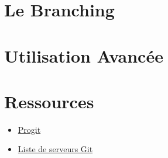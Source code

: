 \documentclass{beamer}
\begin{document}
\section{Le Branching}
\begin{frame}{}
\end{frame}

\section{Utilisation Avancée}
\begin{frame}{}
\end{frame}

\section{Ressources}
\begin{frame}{}
  \begin{itemize}
    \item \href{http://progit.org/about.html}{Progit}
    \item \href{http://git.or.cz/gitwiki/GitHosting}{Liste de serveurs Git}

  \end{itemize}
\end{frame}
\end{document}
